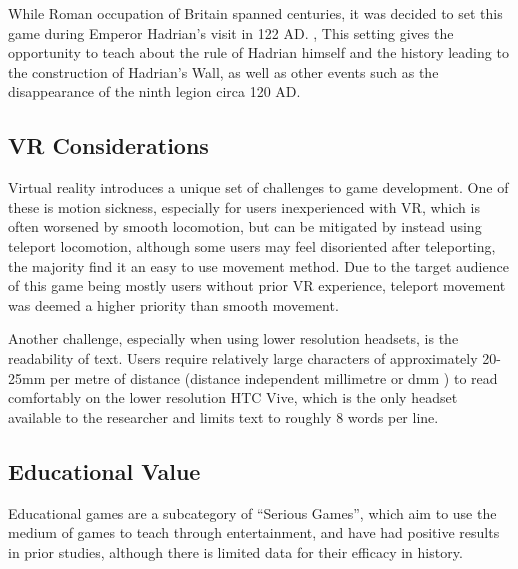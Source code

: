 \documentclass[sigconf,authordraft]{acmart}
\begin{document}
While Roman occupation of Britain spanned centuries, it was decided to set this
game during Emperor Hadrian's visit in 122 AD.
\cite[p.176]{danziger_hadrians_2006}, \cite[p.157]{moffat_wall_2009}
This setting gives the opportunity to teach about the rule of Hadrian himself
and the history leading to the construction of Hadrian's Wall, as well as other
events such as the disappearance of the ninth legion circa 120 AD.


\subsection{VR Considerations}
Virtual reality introduces a unique set of challenges to game development. One
of these is motion sickness, especially for users inexperienced with VR,
\cite{chattha_motion_2020} which is often worsened by smooth locomotion, but can
be mitigated by instead using teleport locomotion, although some users may feel
disoriented after teleporting, the majority find it an easy to use movement
method. \cite{bozgeyikli_point_2016} Due to the target audience of this game
being mostly users without prior VR experience, teleport movement was deemed a
higher priority than smooth movement.

\label{sec:text_scale}
Another challenge, especially when using lower resolution headsets, is the
readability of text. Users require relatively large characters of approximately
20-25mm per metre of distance (distance independent millimetre or dmm
\cite{google_for_developers_designing_2017}) to read comfortably on the lower
resolution HTC Vive, \cite{solum_readability_2019} which is the only headset
available to the researcher and limits text to roughly 8 words per line.


\subsection{Educational Value}
Educational games are a subcategory of ``Serious Games'', which aim to use the
medium of games to teach through entertainment, and have had positive results in
prior studies, although there is limited data for their efficacy in history.
\cite{backlund_educational_2013}
\end{document}
